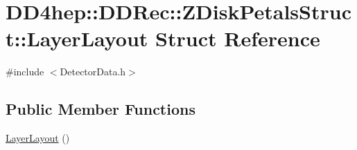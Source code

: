 \hypertarget{struct_d_d4hep_1_1_d_d_rec_1_1_z_disk_petals_struct_1_1_layer_layout}{
\section{DD4hep::DDRec::ZDiskPetalsStruct::LayerLayout Struct Reference}
\label{struct_d_d4hep_1_1_d_d_rec_1_1_z_disk_petals_struct_1_1_layer_layout}
}


{\ttfamily \#include $<$DetectorData.h$>$}\subsection*{Public Member Functions}
\begin{DoxyCompactItemize}
\item 
\hyperlink{struct_d_d4hep_1_1_d_d_rec_1_1_z_disk_petals_struct_1_1_layer_layout_ae927543c3f4f96d195e45e75db37b9b8}{LayerLayout} ()
\end{DoxyCompactItemize}
